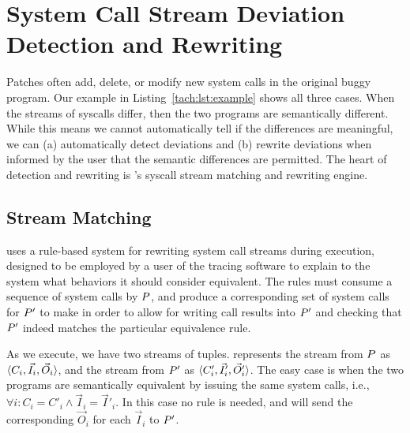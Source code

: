 \section{System Call Stream Deviation Detection and Rewriting}
\label{tach:sec:equiv}

Patches often add, delete, or modify  new system calls in the original
buggy program.  Our example in Listing~\ref{tach:lst:example} shows all
three cases.  When the streams of syscalls differ, then the two programs are
semantically different.  While this means we cannot automatically tell
if the differences are meaningful, we can (a) automatically detect
deviations and (b) rewrite deviations when informed by the user that
the semantic differences are permitted. The heart of detection and
rewriting is \tachyon's syscall stream matching and rewriting engine.




\subsection{Stream Matching}

\tachyon uses a rule-based system for rewriting
system call streams during execution, designed to be employed by a
user of the tracing software to explain to the system what behaviors
it should consider equivalent. The rules must consume a sequence of system calls by
$P$, and produce a corresponding set of system calls for $P'$ to
make in order to allow for writing call results into $P'$ and checking
that $P'$ indeed matches the particular equivalence rule.

As we execute, we have two streams of tuples. \tachyon represents the
stream from $P$ as $\langle C_i, \vec{I}_i, \vec{O}_i \rangle$, and the
stream from $P'$ as $\langle C'_i, \vec{I}'_i, \vec{O}'_i \rangle$.
The easy case is when the two programs are semantically equivalent by
issuing the same system calls, i.e., $\forall i: C_i = C'_i \land \vec{I}_i = \vec{I}'_i$.  In this case no rule is needed, and
\tachyon will send the corresponding $\vec{O}_i$ for each $\vec{I}_i$ to $P'$.

